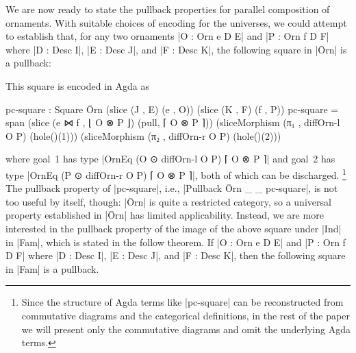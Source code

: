 We are now ready to state the pullback properties for parallel composition of ornaments.
With suitable choices of encoding for the universes, we could attempt to establish that, for any two ornaments |O : Orn e D E| and |P : Orn f D F| where |D : Desc I|, |E : Desc J|, and |F : Desc K|, the following square in |Ōrn| is a pullback:
\begin{center}
\end{center}
This square is encoded in Agda as
\begin{code}
pc-square : Square Ōrn (slice (J , E) (e , O)) (slice (K , F) (f , P))
pc-square = span  (slice (e ⋈ f , ⌊ O ⊗ P ⌋) (pull, ⌈ O ⊗ P ⌉))
                  (sliceMorphism (π₁  , diffOrn-l  O P)  (hole()(1)))
                  (sliceMorphism (π₂  , diffOrn-r  O P)  (hole()(2)))
\end{code}
where goal~1 has type |OrnEq (O ⊙ diffOrn-l O P) ⌈ O ⊗ P ⌉| and goal~2 has type |OrnEq (P ⊙ diffOrn-r O P) ⌈ O ⊗ P ⌉|, both of which can be discharged.%
\footnote{Since the structure of Agda terms like |pc-square| can be reconstructed from commutative diagrams and the categorical definitions, in the rest of the paper we will present only the commutative diagrams and omit the underlying Agda terms.}
The pullback property of |pc-square|, i.e., |Pullback Ōrn _ _ pc-square|, is not too useful by itself, though: |Ōrn| is quite a restricted category, so a universal property established in |Ōrn| has limited applicability.
Instead, we are more interested in the pullback property of the image of the above square under |Ind| in |Fam|, which is stated in the follow theorem.
If |O : Orn e D E| and |P : Orn f D F| where |D : Desc I|, |E : Desc J|, and |F : Desc K|, then the following square in |Fam| is a pullback.
\begin{center}
\end{center}
